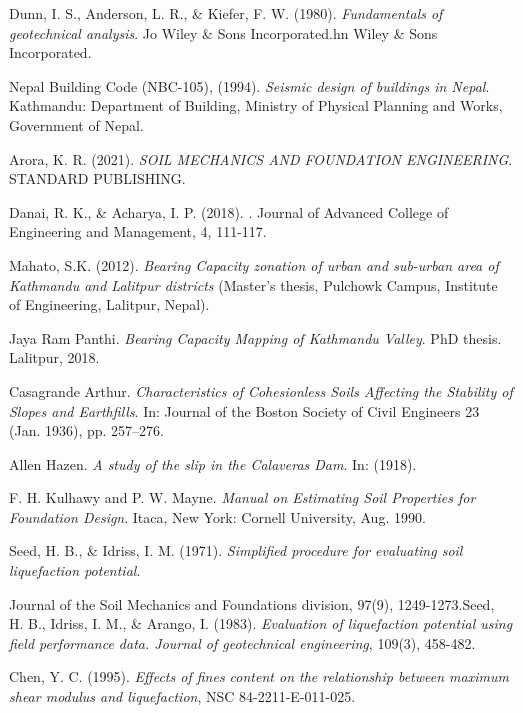 \begin{thebibliography}{99}

Dunn, I. S., Anderson, L. R., \& Kiefer, F. W. (1980). \emph{Fundamentals of geotechnical analysis}. Jo Wiley \& Sons Incorporated.hn Wiley \& Sons Incorporated.

Nepal Building Code (NBC-105), (1994). \emph{Seismic design of buildings in Nepal}. Kathmandu: Department of Building, Ministry of Physical Planning and Works, Government of Nepal.

Arora, K. R. (2021). \emph{SOIL MECHANICS AND FOUNDATION ENGINEERING}. STANDARD PUBLISHING.

Danai, R. K., \& Acharya, I. P. (2018). \cite{Bearing Capacity Analysis and Zoning of Kathmandu for Shallow Foundations}. Journal of Advanced College of Engineering and Management, 4, 111-117.

Mahato, S.K. (2012). \emph{Bearing Capacity zonation of urban and sub-urban area of Kathmandu and Lalitpur districts} (Master’s thesis, Pulchowk Campus, Institute of Engineering, Lalitpur, Nepal).

Jaya Ram Panthi. \emph{Bearing Capacity Mapping of Kathmandu Valley}. PhD thesis. Lalitpur, 2018.

Casagrande Arthur. \emph{Characteristics of Cohesionless Soils Affecting the Stability of Slopes and Earthfills}. In: Journal of the Boston Society of Civil Engineers 23 (Jan. 1936), pp. 257–276.

Allen Hazen. \emph{A study of the slip in the Calaveras Dam}. In: (1918).

F. H. Kulhawy and P. W. Mayne. \emph{Manual on Estimating Soil Properties for Foundation Design}. Itaca, New York: Cornell University, Aug. 1990.

Seed, H. B., \& Idriss, I. M. (1971). \emph{Simplified procedure for evaluating soil liquefaction potential}.

Journal of the Soil Mechanics and Foundations division, 97(9), 1249-1273.Seed, H. B., Idriss, I. M., \& Arango, I. (1983). \emph{Evaluation of liquefaction potential using field performance data. Journal of geotechnical engineering}, 109(3), 458-482.

Chen, Y. C. (1995). \emph{Effects of fines content on the relationship between maximum shear modulus and liquefaction}, NSC 84-2211-E-011-025.


\end{thebibliography}
